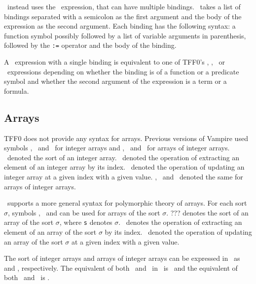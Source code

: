 \extTFF\ instead uses the \dlet\ expression, that can have multiple bindings. \dlet\ takes a list of bindings separated with a semicolon as the first argument and the body of the expression as the second argument. Each binding has the following syntax: a function symbol possibly followed by a list of variable arguments in parenthesis, followed by the \lstinline':=' operator and the body of the binding.

A \dlet\ expression with a single binding is equivalent to one of TFF0's \dlettt, \dletft, \dlettf\ or \dletff\ expressions depending on whether the binding is of a function or a predicate symbol and whether the second argument of the expression is a term or a formula.

\subsection{Arrays}
TFF0 does not provide any syntax for arrays. Previous versions of Vampire used symbols \darrayone, \dselectone\ and \dstoreone\ for integer arrays and \darraytwo, \dselecttwo\ and \dstoretwo\ for arrays of integer arrays. \darrayone\ denoted the sort of an integer array. \dselectone\ denoted the operation of extracting an element of an integer array by its index. \dstoreone\ denoted the operation of updating an integer array at a given index with a given value. \darraytwo, \dselecttwo\ and \dstoretwo\ denoted the same for arrays of integer arrays.

\extTFF\ supports a more general syntax for polymorphic theory of arrays. For each sort $\sigma$, symbols \darraySymb, \dselect\ and \dstore can be used for arrays of the sort $\sigma$. ??? denotes the sort of an array of the sort $\sigma$, where \lstinline's' denotes $\sigma$. \dstore\ denotes the operation of extracting an element of an array of the sort $\sigma$ by its index. \dselect\ denoted the operation of updating an array of the sort $\sigma$ at a given index with a given value.

The sort of integer arrays and arrays of integer arrays can be expressed in \extTFF\ as \darray{\dint}{\dint} and \darray{\dint}{\darray{\dint}{\dint}}, respectively. The equivalent of both \dstoreone\ and \dstoretwo\ in \extTFF\ is \dstore\ and the equivalent of both \dstoreone\ and \dstoretwo\ is \dstore.
